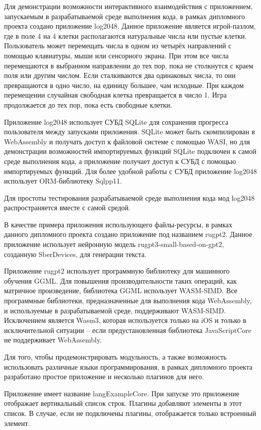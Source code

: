 Для демонстрации возможности интерактивного взаимодействия с приложением, запускаемым в разрабатываемой среде выполнения кода, в рамках дипломного проекта создано приложение log2048.
Данное приложение является игрой-пазлом, где в поле 4 на 4 клетки располагаются натуральные числа или пустые клетки.
Пользователь может перемещать числа в одном из четырёх направлений с помощью клавиатуры, мыши или сенсорного экрана.
При этом все числа перемещаются в выбранном направлении до тех пор, пока не столкнутся с краем поля или другим числом. 
Если сталкиваются два одинаковых числа, то они превращаются в одно число, на единицу большее, чам исходные.
При каждом перемещении случайная свободная клетка превращается в число 1.
Игра продолжается до тех пор, пока есть свободные клетки.

Приложение log2048 использует СУБД SQLite для сохранения прогресса пользователя между запусками приложения.
SQLite может быть скомпилирован в WebAssembly и получать доступ к файловой системе с помощью WASI, но для демонстрации возможностей импортируемых функций SQLite подключен к самой среде выполнения кода, а приложение получает доступ к СУБД с помощью импортируемых функций.
Для более удобной работы с СУБД приложение log2048 использует ORM-библиотеку Sqlpp11.

Для простоты тестирования разрабатываемой среде выполнения кода мод log2048 распространяется вместе с самой средой.

В качестве примера приложения использующего файлы-ресурсы, в рамках данного дипломного проекта создано приложение под названием rugpt2.
Данное приложение использует нейронную модель rugpt3-small-based-on-gpt2, созданную SberDevices, для генерации текста.

Приложение rugpt2 использует программную библиотеку для машинного обучения GGML.
Для повышения производительности таких операций, как матричное произведение, библиотека GGML использует WASM-SIMD.
Все программные библиотеки, предназначенные для выполнения кода WebAssembly, и используемые в разрабатываемой среде, поддерживают WASM-SIMD.
Исключением является Wasm3, которая используется только на iOS и только в исключительной ситуации -- если предустановленная библиотека JavaScriptCore не поддерживает WebAssembly.

Для того, чтобы продемонстрировать модульность, а также возможность использовать различные языки программирования, в рамках дипломного проекта разработано простое приложение и несколько плагинов для него.

Приложение имеет название langExampleCore.
При запуске это приложение отображает вертикальный список строк.
Плагины добавляют элементы в этот список. 
В случае, если не подключены плагины, отображается только встроенный элемент.
